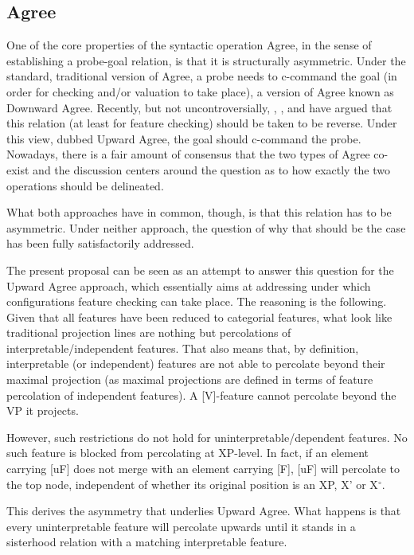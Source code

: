 \documentclass[output=paper
,modfonts
,nonflat]{langsci/langscibook}
\begin{document}
\subsection{Agree}
One of the core properties of the syntactic operation Agree, in the sense of establishing a probe-goal relation, is that it is structurally asymmetric. Under the standard, traditional version of Agree, a probe needs to c-command the goal (in order for checking and/or valuation to take place), a version of Agree known as Downward Agree. Recently, but not uncontroversially, \citet{Wurmbrand2012a, Wurmbrand2012}, \citet{Zeijlstra2012}, and \citet{Bjorkman_ZeijlstraTA} have argued that this relation (at least for feature checking) should be taken to be reverse. Under this view, dubbed Upward Agree, the goal should c-command the probe. Nowadays, there is a fair amount of consensus that the two types of Agree co-exist and the discussion centers around the question as to how exactly the two operations should be delineated.

What both approaches have in common, though, is that this relation has to be asymmetric. Under neither approach, the question of why that should be the case has been fully satisfactorily addressed. 

The present proposal can be seen as an attempt to answer this question for the Upward Agree approach, which essentially aims at addressing under which configurations feature checking can take place. The reasoning is the following. Given that all features have been reduced to categorial features, what look like traditional projection lines are nothing but percolations of interpretable/independent features. That also means that, by definition, interpretable (or independent) features are not able to percolate beyond their maximal projection (as maximal projections are defined in terms of feature percolation of independent features). A [V]-feature cannot percolate beyond the VP it projects.

However, such restrictions do not hold for uninterpretable/dependent features. No such feature is blocked from percolating at XP-level. In fact, if an element carrying [uF] does not merge with an element carrying [F], [uF] will percolate to the top node, independent of whether its original position is an XP, X’ or X$^{\circ}$. 

This derives the asymmetry that underlies Upward Agree. What happens is that every uninterpretable feature will percolate upwards until it stands in a sisterhood relation with a matching interpretable feature. 
\end{document}
